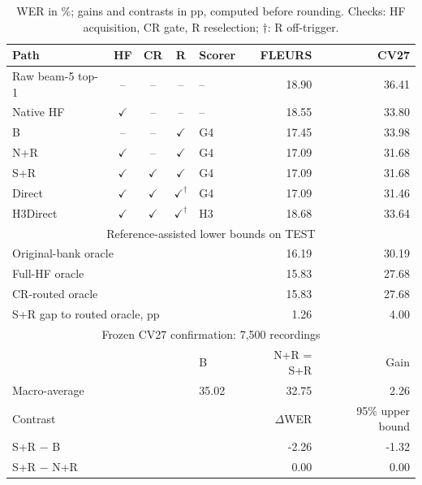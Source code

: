 \begin{table}[H]\centering\footnotesize
\caption{WER in \%; gains and contrasts in pp, computed before rounding. Checks: HF acquisition, CR gate, R reselection; $\dagger$: R off-trigger.}\label{tab:paths}
\setlength{\tabcolsep}{3pt}\renewcommand{\arraystretch}{1.00}
\begin{tabular}{@{}lccclrr@{}}\toprule
Path & HF & CR & R & Scorer & FLEURS & CV27\\\midrule
Raw beam-5 top-1 & -- & -- & -- & -- & 18.90 & 36.41\\
Native HF & $\checkmark$ & -- & -- & -- & 18.55 & 33.80\\
B & -- & -- & $\checkmark$ & G4 & 17.45 & 33.98\\
N+R & $\checkmark$ & -- & $\checkmark$ & G4 & 17.09 & 31.68\\
S+R & $\checkmark$ & $\checkmark$ & $\checkmark$ & G4 & 17.09 & 31.68\\
Direct & $\checkmark$ & $\checkmark$ & $\checkmark^{\dagger}$ & G4 & 17.09 & 31.46\\
H3Direct & $\checkmark$ & $\checkmark$ & $\checkmark^{\dagger}$ & H3 & 18.68 & 33.64\\
\midrule\multicolumn{7}{c}{Reference-assisted lower bounds on TEST}\\
\multicolumn{5}{l}{Original-bank oracle} & 16.19 & 30.19\\
\multicolumn{5}{l}{Full-HF oracle} & 15.83 & 27.68\\
\multicolumn{5}{l}{CR-routed oracle} & 15.83 & 27.68\\
\multicolumn{5}{l}{S+R gap to routed oracle, pp} & 1.26 & 4.00\\
\midrule\multicolumn{7}{c}{Frozen CV27 confirmation: 7,500 recordings}\\
\multicolumn{4}{l}{} & B & N+R = S+R & Gain\\\midrule
\multicolumn{4}{l}{Macro-average} & 35.02 & 32.75 & 2.26\\
\midrule\multicolumn{5}{l}{Contrast} & $\Delta$WER & 95\% upper bound\\
\multicolumn{5}{l}{S+R $-$ B} & -2.26 & -1.32\\
\multicolumn{5}{l}{S+R $-$ N+R} & 0.00 & 0.00\\
\bottomrule\end{tabular}\end{table}
